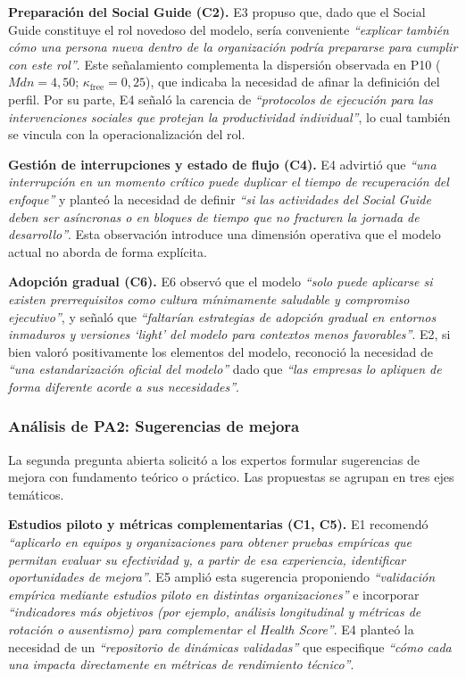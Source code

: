 \textbf{Preparación del Social Guide (C2).} E3 propuso que, dado que el Social Guide constituye el rol novedoso del modelo, sería conveniente \textit{``explicar también cómo una persona nueva dentro de la organización podría prepararse para cumplir con este rol''}. Este señalamiento complementa la dispersión observada en P10 ($Mdn = 4{,}50$; $\kappa_{\text{free}} = 0{,}25$), que indicaba la necesidad de afinar la definición del perfil. Por su parte, E4 señaló la carencia de \textit{``protocolos de ejecución para las intervenciones sociales que protejan la productividad individual''}, lo cual también se vincula con la operacionalización del rol.

\textbf{Gestión de interrupciones y estado de flujo (C4).} E4 advirtió que \textit{``una interrupción en un momento crítico puede duplicar el tiempo de recuperación del enfoque''} y planteó la necesidad de definir \textit{``si las actividades del Social Guide deben ser asíncronas o en bloques de tiempo que no fracturen la jornada de desarrollo''}. Esta observación introduce una dimensión operativa que el modelo actual no aborda de forma explícita.

\textbf{Adopción gradual (C6).} E6 observó que el modelo \textit{``solo puede aplicarse si existen prerrequisitos como cultura mínimamente saludable y compromiso ejecutivo''}, y señaló que \textit{``faltarían estrategias de adopción gradual en entornos inmaduros y versiones `light' del modelo para contextos menos favorables''}. E2, si bien valoró positivamente los elementos del modelo, reconoció la necesidad de \textit{``una estandarización oficial del modelo''} dado que \textit{``las empresas lo apliquen de forma diferente acorde a sus necesidades''}.

\subsubsection{Análisis de PA2: Sugerencias de mejora}

La segunda pregunta abierta solicitó a los expertos formular sugerencias de mejora con fundamento teórico o práctico. Las propuestas se agrupan en tres ejes temáticos.

\textbf{Estudios piloto y métricas complementarias (C1, C5).} E1 recomendó \textit{``aplicarlo en equipos y organizaciones para obtener pruebas empíricas que permitan evaluar su efectividad y, a partir de esa experiencia, identificar oportunidades de mejora''}. E5 amplió esta sugerencia proponiendo \textit{``validación empírica mediante estudios piloto en distintas organizaciones''} e incorporar \textit{``indicadores más objetivos (por ejemplo, análisis longitudinal y métricas de rotación o ausentismo) para complementar el Health Score''}. E4 planteó la necesidad de un \textit{``repositorio de dinámicas validadas''} que especifique \textit{``cómo cada una impacta directamente en métricas de rendimiento técnico''}.

